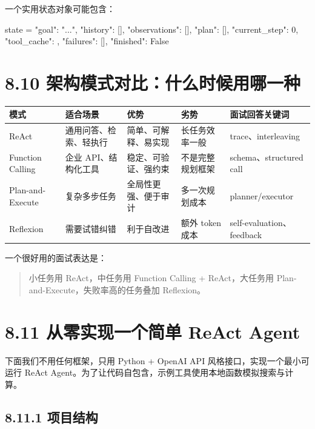 一个实用状态对象可能包含：


\begin{codeblock}
state = {
    "goal": "...",
    "history": [],
    "observations": [],
    "plan": [],
    "current_step": 0,
    "tool_cache": {},
    "failures": [],
    "finished": False
}
\end{codeblock}

\section{8.10 架构模式对比：什么时候用哪一种}

\begingroup
\scriptsize
\setlength{\tabcolsep}{3pt}
\begin{longtable}{|p{}|p{}|p{}|p{}|p{}|}
\hline
模式 & 适合场景 & 优势 & 劣势 & 面试回答关键词 \\ \hline
ReAct & 通用问答、检索、轻执行 & 简单、可解释、易实现 & 长任务效率一般 & trace、interleaving \\ \hline
Function Calling & 企业 API、结构化工具 & 稳定、可验证、强约束 & 不是完整规划框架 & schema、structured call \\ \hline
Plan-and-Execute & 复杂多步任务 & 全局性更强、便于审计 & 多一次规划成本 & planner/executor \\ \hline
Reflexion & 需要试错纠错 & 利于自改进 & 额外 token 成本 & self-evaluation、feedback \\ \hline
\end{longtable}
\endgroup

一个很好用的面试表达是：


\begin{quote}
小任务用 ReAct，中任务用 Function Calling + ReAct，大任务用 Plan-and-Execute，失败率高的任务叠加 Reflexion。\\
\end{quote}

\section{8.11 从零实现一个简单 ReAct Agent}

下面我们不用任何框架，只用 Python + OpenAI API 风格接口，实现一个最小可运行 ReAct Agent。为了让代码自包含，示例工具使用本地函数模拟搜索与计算。


\subsection{8.11.1 项目结构}

